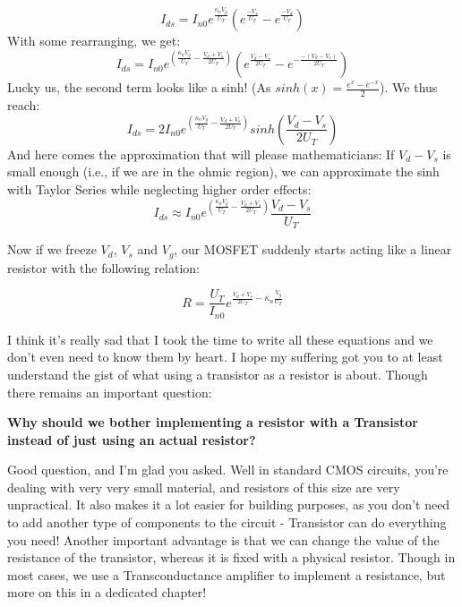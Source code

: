 \begin{equation}
I_{ds} = I_{n0} e^{\frac{\kappa_{n}V_g}{U_T}}(e^\frac{-V_s}{U_T} - e^\frac{-V_d}{U_T}) 
\end{equation}
With some rearranging, we get: 
\begin{equation}
I_{ds} = I_{n0} e^{(\frac{\kappa_n V_g}{U_T}-\frac{V_d + V_s}{2U_T})}(e^{\frac{V_d - V_s}{2U_T}} - e^{-\frac{-(V_d - V_s)}{2U_T}})
\end{equation}
Lucky us, the second term looks like a sinh! (As $sinh(x) = \frac{e^x - e^{-x}}{2}$). 
We thus reach: 
\begin{equation}
I_{ds} = 2I_{n0} e^{(\frac{\kappa_n V_g}{U_T}-\frac{V_d + V_s}{2U_T})}sinh(\frac{V_d - V_s}{2U_T})
\end{equation}
And here comes the approximation that will please mathematicians: If $V_d - V_s$ is small enough (i.e., if we are in the ohmic region), we can approximate the sinh with Taylor Series while neglecting higher order effects: 
\begin{equation}
I_{ds} \approx  I_{n0} e^{(\frac{\kappa_n V_g}{U_T}-\frac{V_d + V_s}{2U_T})}\frac{V_d - V_s}{U_T}
\end{equation}

Now if we freeze $V_d$, $V_s$ and $V_g$, our MOSFET suddenly starts acting like a linear resistor with the following relation: 

\begin{equation}
R = \frac{U_T}{I_{n0}}e^{\frac{V_d + V_s}{2U_T} - \kappa_n \frac{V_g}{U_T}}
\end{equation}

I think it's really sad that I took the time to write all these equations and we don't even need to know them by heart. I hope my suffering got you to at least understand the gist of what using a transistor as a resistor is about. Though there remains an important question: 

\textbf{Why should we bother implementing a resistor with a Transistor instead of just using an actual resistor?}

Good question, and I'm glad you asked. Well in standard CMOS circuits, you're dealing with very very small material, and resistors of this size are very unpractical. It also makes it a lot easier for building purposes, as you don't need to add another type of components to the circuit - Transistor can do everything you need! Another important advantage is that we can change the value of the resistance of the transistor, whereas it is fixed with a physical resistor. Though in most cases, we use a Transconductance amplifier to implement a resistance, but more on this in a dedicated chapter!

